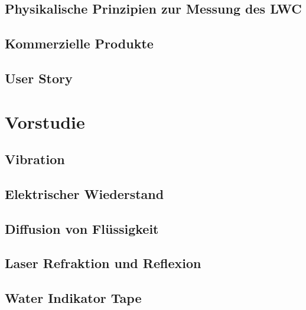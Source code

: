 \documentclass[a4paper,12pt]{article}
\begin{document}
\subsection{Physikalische Prinzipien zur Messung des LWC}


\subsection{Kommerzielle Produkte}


\subsection{User Story}



\newpage
\section{Vorstudie}


\subsection{Vibration}


\subsection{Elektrischer Wiederstand}


\subsection{Diffusion von Flüssigkeit}
\label{sec:TinteVersuchsaufbau}


\subsection{Laser Refraktion und Reflexion}


\subsection{Water Indikator Tape}
\label{sec:5559}

\end{document}
